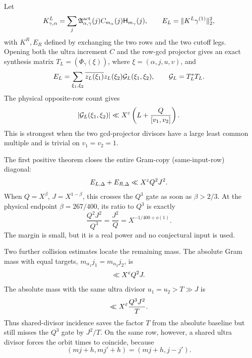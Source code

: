 Let
\[
 K^L_{\gamma,\alpha}
 =\sum_j\mathfrak A^{\rm act}_{\alpha,\gamma}(j)
 C_{m_\alpha}(j)\mathsf H_{m_\gamma}(j),
 \qquad
 E_L=\|K^L\gamma^{(1)}\|_2^2,
\]
with \(K^R,E_R\) defined by exchanging the two rows and the two cutoff
legs.  Opening both the ultra increment \(C\) and the row-gcd projector
gives an exact synthesis matrix \(T_L=(\Phi_\gamma(\xi))\), where
\(\xi=(\alpha,j,u,v)\), and
\begin{equation}
 E_L
 =\sum_{\xi_1,\xi_2}
 \overline{z_L(\xi_1)}z_L(\xi_2)
 \mathcal G_L(\xi_1,\xi_2),
 \qquad \mathcal G_L=T_L^*T_L.
 \label{eq:tpc34-intro-Gram}
\end{equation}
The physical opposite-row count gives
\begin{equation}
 |\mathcal G_L(\xi_1,\xi_2)|
 \ll X^\varepsilon\left(L+\frac{Q}{[v_1,v_2]}\right).
 \label{eq:tpc34-intro-kernel-bound}
\end{equation}
This is strongest when the two gcd-projector divisors have a large least
common multiple and is trivial on \(v_1=v_2=1\).

The first positive theorem closes the entire Gram-copy
(same-input-row) diagonal:
\begin{equation}
 E_{L,\Delta}+E_{R,\Delta}
 \ll X^\varepsilon Q^2J^2.
 \label{eq:tpc34-intro-row-diagonal}
\end{equation}
When \(Q=X^\beta\), \(J=X^{1-\beta}\), this crosses the \(Q^3\) gate as
soon as \(\beta>2/3\).  At the physical endpoint
\(\beta=267/400\), its ratio to \(Q^3\) is exactly
\begin{equation}
 \frac{Q^2J^2}{Q^3}=\frac{J^2}{Q}
 =X^{-1/400+o(1)}.
 \label{eq:tpc34-intro-margin}
\end{equation}
The margin is small, but it is a real power and no conjectural input is
used.

Two further collision estimates locate the remaining mass.  The absolute
Gram mass with equal targets,
\(m_{\alpha_1}j_1=m_{\alpha_2}j_2\), is
\begin{equation}
 \ll X^\varepsilon Q^2J.
 \label{eq:tpc34-intro-target-collision}
\end{equation}
The absolute mass with the same ultra divisor \(u_1=u_2>T\gg J\) is
\begin{equation}
 \ll X^\varepsilon\frac{Q^3J^2}{T}.
 \label{eq:tpc34-intro-ultra-collision}
\end{equation}
Thus shared-divisor incidence saves the factor \(T\) from the absolute
baseline but still misses the \(Q^3\) gate by \(J^2/T\).  On the same
row, however, a shared ultra divisor forces the orbit times to coincide,
because
\begin{equation}
 (mj+h,mj'+h)=(mj+h,j-j').
 \label{eq:tpc34-intro-transposed-gcd}
\end{equation}

